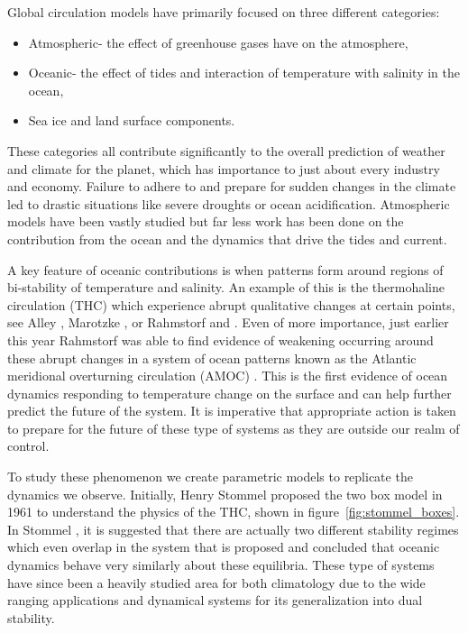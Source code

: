 Global circulation models have primarily focused on three different categories: 
\begin{itemize}
\item Atmospheric- the effect of greenhouse gases have on the atmosphere,
\item Oceanic- the effect of tides and interaction of temperature with salinity in the ocean,
\item Sea ice and land surface components.
\end{itemize}
These categories all contribute significantly to the overall prediction of weather and climate for the planet, which has importance to just about every industry and economy. Failure to adhere to and prepare for sudden changes in the climate led to drastic situations like severe droughts or ocean acidification. Atmospheric models have been vastly studied but far less work has been done on the contribution from the ocean and the dynamics that drive the tides and current.

A key feature of oceanic contributions is when patterns form around regions of bi-stability of temperature and salinity. An example of this is the thermohaline circulation (THC) which experience abrupt qualitative changes at certain points, see Alley \cite{alley2003abrupt},
Marotzke \cite{marotzke2000abrupt},
or Rahmstorf \cite{rahmstorf2000thermohaline} and
\cite{rahmstorf2002ocean}. Even of more importance, just earlier this year Rahmstorf was able to find evidence of weakening occurring around these abrupt changes in a system of ocean patterns known as the Atlantic meridional overturning circulation (AMOC) \cite{caesar2018AMOC}. This is the first evidence of ocean dynamics responding to temperature change on the surface and can help further predict the future of the system. It is imperative that appropriate action is taken to prepare for the future of these type of systems as they are outside our realm of control. 

To study these phenomenon we create parametric models to replicate the dynamics we observe. Initially, Henry Stommel proposed the two box model in 1961 to understand the physics of the THC, shown in figure~\ref{fig:stommel_boxes}. In Stommel \cite{stommel1961thermohaline}, it is suggested that there are actually two different stability regimes which even overlap in the system that is proposed and concluded that oceanic dynamics behave very similarly about these equilibria. These type of systems have since been a heavily studied area for both climatology due to the wide ranging applications and dynamical systems for its generalization into dual stability.

